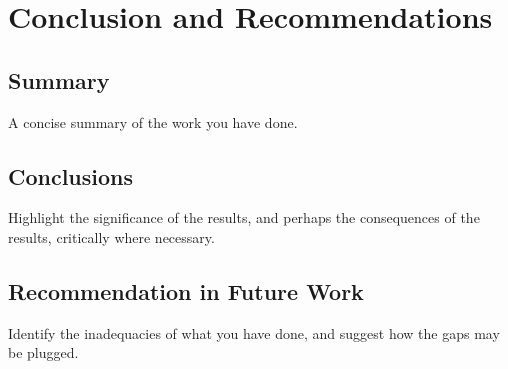 
\chapter{Conclusion and Recommendations}
\label{cha:conclusion}
\begin{spacing}{1.5}
\setlength{\parskip}{0.3in}

\section{Summary}

A concise summary of the work you have done.

\section{Conclusions}

Highlight the significance of the results, and perhaps the consequences of the results, critically where necessary.

\section{Recommendation in Future Work}

Identify the inadequacies of what you have done, and suggest how the gaps may be plugged.


\end{spacing}
\newpage
